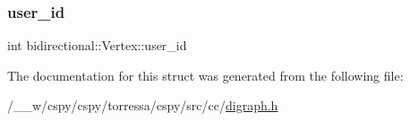\subsubsection{\texorpdfstring{user\+\_\+id}{user\_id}}
{\footnotesize\ttfamily int bidirectional\+::\+Vertex\+::user\+\_\+id}



The documentation for this struct was generated from the following file\+:\begin{DoxyCompactItemize}
\item 
/\+\_\+\+\_\+w/cspy/cspy/torressa/cspy/src/cc/\hyperlink{digraph_8h}{digraph.\+h}\end{DoxyCompactItemize}
